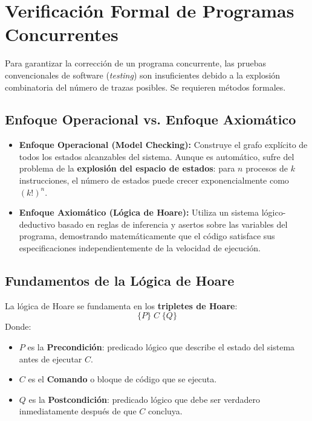 \section{Verificación Formal de Programas Concurrentes}

Para garantizar la corrección de un programa concurrente, las pruebas convencionales de software (\textit{testing}) son insuficientes debido a la explosión combinatoria del número de trazas posibles. Se requieren métodos formales.

\subsection{Enfoque Operacional vs. Enfoque Axiomático}
\begin{itemize}[leftmargin=*]
    \item \textbf{Enfoque Operacional (Model Checking):} Construye el grafo explícito de todos los estados alcanzables del sistema. Aunque es automático, sufre del problema de la \textbf{explosión del espacio de estados}: para $n$ procesos de $k$ instrucciones, el número de estados puede crecer exponencialmente como $(k!)^n$.
    \item \textbf{Enfoque Axiomático (Lógica de Hoare):} Utiliza un sistema lógico-deductivo basado en reglas de inferencia y asertos sobre las variables del programa, demostrando matemáticamente que el código satisface sus especificaciones independientemente de la velocidad de ejecución.
\end{itemize}

\subsection{Fundamentos de la Lógica de Hoare}
La lógica de Hoare se fundamenta en los \textbf{tripletes de Hoare}:
\begin{equation}
\{P\} \; C \; \{Q\}
\end{equation}
Donde:
\begin{itemize}
    \item $P$ es la \textbf{Precondición}: predicado lógico que describe el estado del sistema antes de ejecutar $C$.
    \item $C$ es el \textbf{Comando} o bloque de código que se ejecuta.
    \item $Q$ es la \textbf{Postcondición}: predicado lógico que debe ser verdadero inmediatamente después de que $C$ concluya.
\end{itemize}

